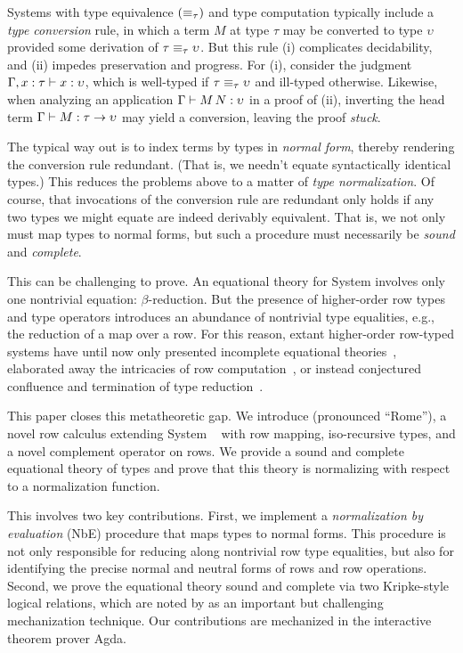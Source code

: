 \documentclass[sigplan,screen]{acmart}
\begin{document}
Systems with type equivalence $({\equiv_{\tau}})$ and type computation typically include a \emph{type conversion} rule, in which a term $M$ at type $\tau$ may be converted to type $\upsilon$ provided some derivation of $\tau \equiv_{\tau} \upsilon$. But this rule (i) complicates decidability, and (ii) impedes preservation and progress. For (i), consider the judgment $\Gamma, x : \tau \vdash x : \upsilon$, which is well-typed if $\tau \equiv_{\tau} \upsilon$ and ill-typed otherwise. Likewise, when analyzing an application $\Gamma \vdash M\, N : \upsilon$ in a proof of (ii), inverting the head term $\Gamma \vdash M : \tau \to \upsilon$  may yield a conversion, leaving the proof \emph{stuck}. 

The typical way out is to index terms by types in \emph{normal form}, thereby rendering the conversion rule redundant. (That is, we needn't equate syntactically identical types.) This reduces the problems above to a matter of \emph{type normalization}. Of course, that invocations of the conversion rule are redundant only holds if any two types we might equate are indeed derivably equivalent. That is, we not only must map types to normal forms, but such a procedure must necessarily be \emph{sound} and \emph{complete}.

This can be challenging to prove. An equational theory for System \FO involves only one nontrivial equation: $\beta$-reduction. But the presence of higher-order row types and type operators introduces an abundance of nontrivial type equalities, e.g., the reduction of a map over a row. For this reason, extant higher-order row-typed systems have until now only presented incomplete equational theories~\citep{HubersM23}, elaborated away the intricacies of row computation~\citep{TooheyCJX26}, or instead conjectured confluence and termination of type reduction~\citep{Chlipala10}.

This paper closes this metatheoretic gap. We introduce \Rome{} (pronounced ``Rome''), a novel row calculus extending System \RO~\citep{HubersM23} with row mapping, iso-recursive types, and a novel complement operator on rows. We provide a sound and complete equational theory of \Rome{} types and prove that this theory is normalizing with respect to a normalization function.

This involves two key contributions. First, we implement a \emph{normalization by evaluation} (NbE) procedure that maps types to normal forms. This procedure is not only responsible for reducing along nontrivial row type equalities, but also for identifying the precise normal and neutral forms of rows and row operations. Second, we prove the equational theory sound and complete via two Kripke-style logical relations, which are noted by  as an important but challenging mechanization technique. Our contributions are mechanized in the interactive theorem prover Agda.  
\end{document}
